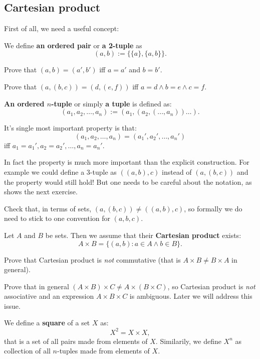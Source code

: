 \subsection{Cartesian product}
First of all, we need a useful concept:
\begin{definition}
  We define \textbf{an ordered pair} or \textbf{a 2-tuple} as
  $$(a,b) := \{\{a\}, \{a, b\}\}.$$
\end{definition}

\begin{prob}
  Prove that $(a,b)=(a',b')$ iff $a=a'$ and $b=b'$.
\end{prob}

\begin{prob}
  Prove that $(a,(b,c))=(d,(e,f))$ iff $a=d\wedge b=e\wedge c=f$.
\end{prob}

\begin{definition}
  \textbf{An ordered $n$-tuple} or simply \textbf{a tuple} is defined as:
  $$(a_1,a_2,\dots, a_n) := (a_1, (a_2, (..., a_n)) \dots ).$$

  It's single most important property is that:
  $$(a_1,a_2,\dots,a_n)=(a_1', a_2', \dots, a_n')$$ iff $a_1=a_1', a_2=a_2', \dots, a_n=a_n'.$
\end{definition}

In fact the property is much more important than the explicit construction. For example we could define a 3-tuple as $((a,b),c)$ instead of $(a, (b,c))$ and
the property would still hold! But one needs to be careful about the notation, as shows the next exercise.

\begin{exercise}
  Check that, in terms of sets, $(a,(b,c))\neq ((a,b),c)$, so formally we do need to stick to one convention for $(a,b,c)$.
\end{exercise}

\begin{definition}
  Let $A$ and $B$ be sets. Then we assume that their
  \textbf{Cartesian product} exists:
  $$A\times B = \{(a,b) : a\in A\wedge b\in B\}.$$
\end{definition}

\begin{exercise}
  Prove that Cartesian product is \textit{not} commutative (that is $A\times B\neq B\times A$ in general).
\end{exercise}

\begin{prob}
  Prove that in general $(A\times B)\times C\neq A\times (B\times C)$, so Cartesian product is \textit{not} associative and an expression $A\times B\times C$ is ambiguous.
  Later we will address this issue.
\end{prob}

\begin{definition}
  We define a \textbf{square} of a set $X$ as:
  $$X^2 = X\times X,$$
  that is a set of all pairs made from elements of $X$.
  Similarily, we define $X^n$ as collection of all $n$-tuples made from elements of $X$.
\end{definition}
